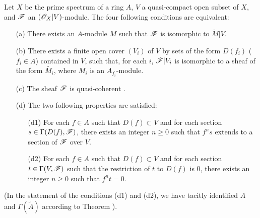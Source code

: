 \begin{thm}[1.4.1]
\label{1.1.4.1}
Let $X$ be the prime spectrum of a ring $A$, $V$ a quasi-compact open subset of $X$, and
$\mathscr{F}$ an $(\mathscr{O}_X|V)$-module. The four following conditions are equivalent:
\begin{itemize}
  \item[{\rm(a)}] There exists an $A$-module $M$ such that $\mathscr{F}$ is isomorphic to $\widetilde{M}|V$.
  \item[{\rm(b)}] There exists a finite open cover $(V_i)$ of $V$ by sets of the form $D(f_i)$
    ($f_i\in A$) contained in $V$, such that, for each $i$, $\mathscr{F}|V_i$ is isomorphic to
    a sheaf of the form $\widetilde{M_i}$, where $M_i$ is an $A_{f_i}$-module.
  \item[{\rm(c)}] The sheaf $\mathscr{F}$ is quasi-coherent .
  \item[{\rm(d)}] The two following properties are satisfied:
    \begin{itemize}
      \item[{\rm(d1)}] For each $f\in A$ such that $D(f)\subset V$ and for each section
        $s\in\Gamma(D(f),\mathscr{F})$, there exists an integer $n\geqslant 0$ such that
        $f^n s$ extends to a section of $\mathscr{F}$ over $V$.
      \item[{\rm(d2)}] For each $f\in A$ such that $D(f)\subset V$ and for each section
        $t\in\Gamma(V,\mathscr{F})$ such that the restriction of $t$ to $D(f)$ is $0$,
        there exists an integer $n\geqslant 0$ such that $f^n t=0$.
    \end{itemize}
\end{itemize}
\end{thm}
(In the statement of the conditions (d1) and (d2), we have tacitly identified $A$ and
$\Gamma(\widetilde{A})$ according to Theorem ).

